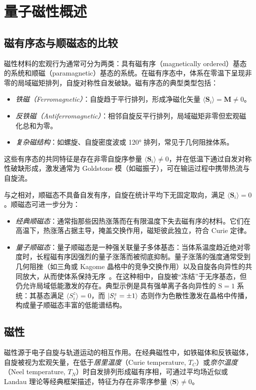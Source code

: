 \section{量子磁性概述}\label{sec:quantum_magnetism}
\subsection{磁有序态与顺磁态的比较}

磁性材料的宏观行为通常可分为两类：具有磁有序（magnetically ordered）基态的系统和顺磁（paramagnetic）基态的系统。在磁有序态中，体系在零温下呈现非零的局域磁矩排列，自旋对称性自发破缺。磁有序态的典型类型包括：

\begin{itemize}
    \item \emph{铁磁（Ferromagnetic）}：自旋趋于平行排列，形成净磁化矢量 $\langle \mathbf{S}_i \rangle = \mathbf{M} \neq 0$。
    \item \emph{反铁磁（Antiferromagnetic）}：相邻自旋反平行排列，局域磁矩非零但宏观磁化总和为零。
    \item \emph{复杂磁结构}：如螺旋、自旋密度波或 120° 排列，常见于几何阻挫体系。
\end{itemize}

这些有序态的共同特征是存在非零自旋序参量 $\langle \mathbf{S}_i \rangle \neq 0$，并在低温下通过自发对称性破缺形成，激发通常为 Goldstone 模（如磁振子），可在输运过程中携带热流与自旋流。

与之相对，顺磁态不具备自发有序，自旋在统计平均下无固定取向，满足 $\langle \mathbf{S}_i \rangle = 0$。顺磁态可进一步分为：

\begin{itemize}
    \item \emph{经典顺磁态}：通常指那些因热涨落而在有限温度下失去磁有序的材料。它们在高温下，热涨落占据主导，掩盖交换作用，磁矩彼此独立，符合 Curie 定律。
    \item \emph{量子顺磁态}：量子顺磁态是一种强关联量子多体基态：当体系温度趋近绝对零度时，长程磁有序因强烈的量子涨落而被彻底抑制。量子涨落的强度通常受到几何阻挫（如三角或 Kagome 晶格中的竞争交换作用）以及自旋各向异性的共同放大，从而使体系保持无序~\cite{bandyopadhyay2024Quantum}。在这种相中，自旋被“冻结”于无序基态，但仍允许局域低能激发的存在。典型示例是具有强单离子各向异性的 $\mathrm{S}=1$ 系统：其基态满足 $\langle S_i^{z}\rangle = 0$，而 $\ket{S_i^{z}=\pm 1}$  态则作为色散性激发在晶格中传播，构成量子顺磁态丰富的低能谱结构。
\end{itemize}

\subsection{磁性}
磁性源于电子自旋与轨道运动的相互作用。在经典磁性中，如铁磁体和反铁磁体，自旋被视为宏观矢量，在低于\emph{居里温度}（Curie temperature, $T_C$）或\emph{奈尔温度}（Neel temperature, $T_N$）时自发排列形成磁有序相，可通过平均场近似或 Landau 理论等经典框架描述，特征为存在非零序参量 $\langle \mathbf{S} \rangle \neq 0$。


